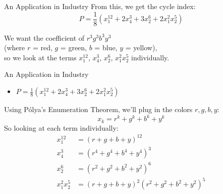 \documentclass{beamer}
\begin{document}

\begin{frame}{An Application in Industry}
From this, we get the cycle index:\\
\[P = \frac{1}{8}(x_1^{12}+2x_4^3 +3x_2^6 +2x_1^2 x_2^5)\]

We want the coefficient of $r^3g^3b^3y^3$\\
(where $r$ = red, $g$ = green, $b$ = blue, $y$ = yellow),\\

so we look at the terms $x_1^{12}$, $x_4^{3}$, $x_2^{6}$, $x_1^{2}x_2^5$ individually.\\
\end{frame}

\begin{frame}{An Application in Industry}
\begin{itemize}
\item $P = \frac{1}{8}(x_1^{12}+2x_4^3 +3x_2^6 +2x_1^2 x_2^5)$
\end{itemize}
Using Pólya's Enumeration Theorem, we'll plug in the colors $r,g,b,y$:\\
\[x_k = r^k + g^k + b^k + y^k\]
So looking at each term individually:
\begin{align*}
x_1^{12} &= (r+g+b+y)^{12}\\
x_4^3 &=(r^4+g^4+b^4+y^4)^3\\
x_2^6 &=(r^2+g^2+b^2+y^2)^6\\
x_1^{2}x_2^5 &= (r+g+b+y)^2(r^2+g^2+b^2+y^2)^5\\
\end{align*}
\end{frame}
\end{document}
